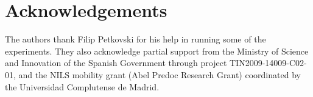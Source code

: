 \documentclass[11pt]{article}
\begin{document}
\section*{Acknowledgements}

The authors thank Filip Petkovski for his help in running some of the
experiments. They also acknowledge partial support from the Ministry
of Science and Innovation of the Spanish Government through project
TIN2009-14009-C02-01, and the NILS mobility grant (Abel Predoc
Research Grant) coordinated by the Universidad Complutense de Madrid.



\end{document}
